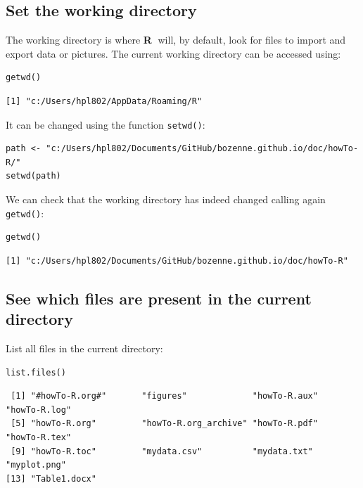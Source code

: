 \documentclass{article}
\newcommand\Rlogo{\textbf{\textsf{R}}\xspace}
\begin{document}
\subsection{Set the working directory}
\label{sec:org608f684}

The working directory is where \Rlogo \(\;\) will, by default, look for files
to import and export data or pictures. The current working directory
can be accessed using:
\lstset{language=r,label= ,caption= ,captionpos=b,numbers=none}
\begin{lstlisting}
getwd()
\end{lstlisting}

\begin{verbatim}
[1] "c:/Users/hpl802/AppData/Roaming/R"
\end{verbatim}

It can be changed using the function \texttt{setwd()}:
\lstset{language=r,label= ,caption= ,captionpos=b,numbers=none}
\begin{lstlisting}
path <- "c:/Users/hpl802/Documents/GitHub/bozenne.github.io/doc/howTo-R/"
setwd(path)
\end{lstlisting}

We can check that the working directory has indeed changed calling
again \texttt{getwd()}:
\lstset{language=r,label= ,caption= ,captionpos=b,numbers=none}
\begin{lstlisting}
getwd()
\end{lstlisting}

\begin{verbatim}
[1] "c:/Users/hpl802/Documents/GitHub/bozenne.github.io/doc/howTo-R"
\end{verbatim}

\subsection{See which files are present in the current directory}
\label{sec:org468a8f7}

List all files in the current directory:
\lstset{language=r,label= ,caption= ,captionpos=b,numbers=none}
\begin{lstlisting}
list.files()
\end{lstlisting}

\begin{verbatim}
 [1] "#howTo-R.org#"       "figures"             "howTo-R.aux"         "howTo-R.log"        
 [5] "howTo-R.org"         "howTo-R.org_archive" "howTo-R.pdf"         "howTo-R.tex"        
 [9] "howTo-R.toc"         "mydata.csv"          "mydata.txt"          "myplot.png"         
[13] "Table1.docx"
\end{verbatim}
\end{document}
